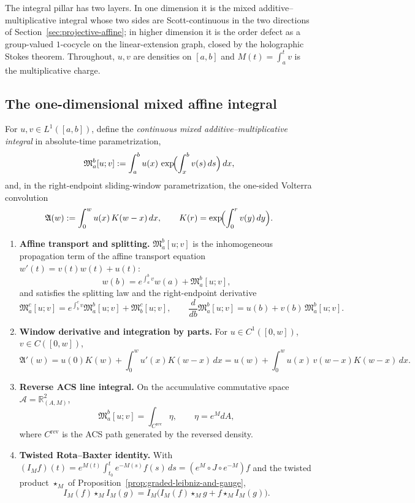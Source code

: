
The integral pillar has two layers.  In one dimension it is the mixed
additive--multiplicative integral whose two sides are Scott-continuous in the
two directions of Section~\ref{sec:projective-affine}; in higher dimension it is
the order defect as a group-valued $1$-cocycle on the linear-extension graph,
closed by the holographic Stokes theorem.  Throughout, $u,v$ are densities on
$[a,b]$ and $M(t)=\int_a^t v$ is the multiplicative charge.

\subsection{The one-dimensional mixed affine integral}

\begin{definition}
\label{def:mixed-affine-integral}
For $u,v\in L^1([a,b])$, define the \emph{continuous mixed additive--multiplicative
integral} in absolute-time parametrization,
\[
  \mathfrak M_a^b[u;v]:=\int_a^b u(x)\,\exp\!\Bigl(\int_x^b v(s)\,ds\Bigr)\,dx ,
\]
and, in the right-endpoint sliding-window parametrization, the one-sided
Volterra convolution
\[
  \mathfrak A(w):=\int_0^w u(x)\,K(w-x)\,dx,
  \qquad
  K(r)=\exp\!\Bigl(\int_0^r v(y)\,dy\Bigr).
\]
\end{definition}

\begin{proposition}
\label{prop:mixed-integral-equivalences}
\begin{enumerate}
  \item \textbf{Affine transport and splitting.} $\mathfrak M_a^b[u;v]$ is the
  inhomogeneous propagation term of the affine transport equation
  $w'(t)=v(t)w(t)+u(t)$:
  \[
    w(b)=e^{\int_a^b v}w(a)+\mathfrak M_a^b[u;v],
  \]
  and satisfies the splitting law and the right-endpoint derivative
  \[
    \mathfrak M_a^c[u;v]=e^{\int_b^c v}\mathfrak M_a^b[u;v]+\mathfrak M_b^c[u;v],
    \qquad
    \frac{d}{db}\mathfrak M_a^b[u;v]=u(b)+v(b)\,\mathfrak M_a^b[u;v].
  \]
  \item \textbf{Window derivative and integration by parts.} For
  $u\in C^1([0,w])$, $v\in C([0,w])$,
  \[
    \mathfrak A'(w)=u(0)K(w)+\int_0^w u'(x)K(w-x)\,dx
    =u(w)+\int_0^w u(x)\,v(w-x)K(w-x)\,dx .
  \]
  \item \textbf{Reverse ACS line integral.} On the accumulative commutative space
  $\mathcal A=\mathbb R^2_{(A,M)}$,
  \[
    \mathfrak M_a^b[u;v]=\int_{C^{\mathrm{rev}}}\eta ,
    \qquad
    \eta=e^M dA ,
  \]
  where $C^{\mathrm{rev}}$ is the ACS path generated by the reversed density.
  \item \textbf{Twisted Rota--Baxter identity.} With
  $(I_M f)(t)=e^{M(t)}\int_{t_0}^t e^{-M(s)}f(s)\,ds=(e^M\circ J\circ e^{-M})f$
  and the twisted product $\star_M$ of
  Proposition~\ref{prop:graded-leibniz-and-gauge},
  \[
    I_M(f)\star_M I_M(g)=I_M\bigl(I_M(f)\star_M g+f\star_M I_M(g)\bigr).
  \]
\end{enumerate}
\end{proposition}

